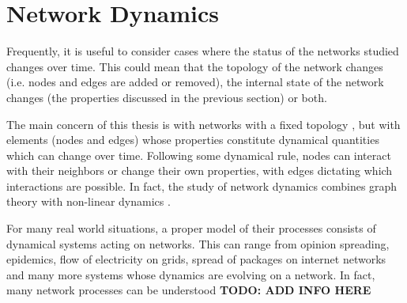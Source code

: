 \clearpage
\section{Network Dynamics}

Frequently, it is useful to consider cases where the status of the
networks studied changes over time. This could mean that the topology
of the network changes (i.e. nodes and edges are added or removed),
the internal state of the network changes (the properties discussed in
the previous section) or both. 

The main concern of this thesis is with networks with a fixed topology
, but with elements (nodes and edges) whose properties constitute
dynamical quantities which can change over time. Following some dynamical
rule, nodes can interact with their neighbors or change their own
properties, with edges dictating which interactions are possible.
In fact, the study of network dynamics combines graph theory with
non-linear dynamics \cite{book:Jost2007}.

For many real world situations, a proper model of their processes
consists of dynamical systems acting on networks. This can range
from opinion spreading, epidemics, flow of electricity on grids,
spread of packages on internet networks and many more systems
whose dynamics are evolving on a network. In fact, many network
processes can be understood 
\textbf{TODO: ADD INFO HERE}